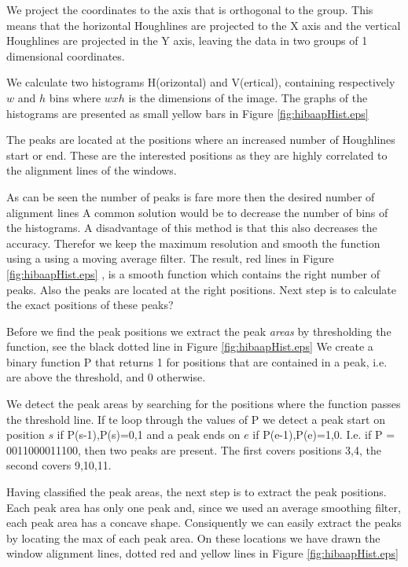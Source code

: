 We project the coordinates to the axis that is orthogonal to the group. This means
that the horizontal Houghlines are projected to the X axis and the vertical
Houghlines are projected in the Y axis, leaving the data in two groups of 1
dimensional coordinates.

We calculate two histograms H(orizontal) and V(ertical), containing respectively
$w$ and $h$ bins where $w x h$ is the dimensions of the image.  The graphs of
the histograms are presented as small yellow bars in Figure
\ref{fig:hibaapHist.eps}

The peaks are located at the positions where an increased number of Houghlines
start or end.  These are the interested positions as they are highly correlated
to the alignment lines of the windows. 

As can be seen the number of peaks is fare more then the desired number of alignment lines 
A common solution would be to decrease the number of bins of the histograms. A
disadvantage of this method is that this also decreases the accuracy. Therefor
we keep the maximum resolution and smooth the function using a using a moving
average filter.
The result, red lines in Figure \ref{fig:hibaapHist.eps}
, is a smooth function which contains the right number of peaks. Also the peaks
are located at the right positions. Next step is to calculate the exact positions of these
peaks?

Before we find the peak positions we extract the peak \emph{areas} by thresholding the
function, see the black dotted line in Figure \ref{fig:hibaapHist.eps}
We create a binary function P that returns 1 for positions that are contained in
a peak, i.e. are above the threshold, and 0 otherwise.

We detect the peak areas by searching for the positions where the function
passes the threshold line. 
If te loop through the values of P we detect a peak start on position $s$ if {P(s-1),P(s)}={0,1}
and a peak ends on $e$ if {P(e-1),P(e)}={1,0}. 
I.e. if P = 0011000011100, then two peaks are present. The first covers positions {3,4}, 
the second covers {9,10,11}. 

Having classified the peak areas, the next step is to extract the peak positions. 
Each peak area has only one peak and, since we used an average smoothing filter, each
peak area has a concave shape. Consiquently we can easily extract the peaks
by locating the max of each peak area. 
On these locations we have drawn the window alignment lines, dotted red and yellow lines
in Figure \ref{fig:hibaapHist.eps}


